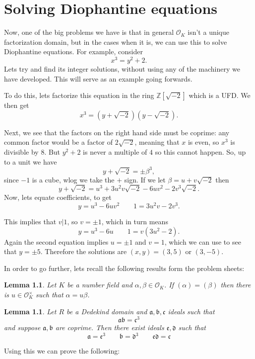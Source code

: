 \documentclass[11pt,a4paper]{report}
\theoremstyle{plain}
\newtheorem{lem}[subsection]{Lemma}
\theoremstyle{definition}
\theoremstyle{definition}
\newcommand{\ZZ}{\mathbb{Z}}
\def\gothb{\mathfrak{b}}
\def\gothc{\mathfrak{c}}
\def \a{\alpha}
\def \OO {\mathcal{O}}
\def\gotha{\mathfrak{a}}
\begin{document}
\chapter{Solving Diophantine equations}
Now, one of the big problems we have is that in general $\OO_K$ isn't a unique factorization domain, but in the cases when it is, we can use this to solve Diophantine equations. For example, consider \[x^3=y^2+2.\] Lets try and find its integer solutions, without using any of the machinery we have developed. This will serve as an example going forwards.

To do this, lets factorize this equation in the ring $\ZZ[\sqrt{-2}]$ which is a UFD. We then get \[x^3=(y+\sqrt{-2})(y-\sqrt{-2}).\]

Next, we see that the factors on the right hand side must be coprime: any common factor would be a factor of $2\sqrt{-2}$, meaning that $x$ is even, so $x^3$ is divisible by $8$. But $y^2+2$ is never a multiple of $4$ so this cannot happen. So, up to a unit we have \[y+\sqrt{-2}=\pm \beta^3,\] since $-1$ is a cube, wlog we take the $+$ sign. If we let $\beta=u+v\sqrt{-2}$ then \[y+\sqrt{-2}=u^3+3u^2v\sqrt{-2}-6uv^2-2v^3\sqrt{-2}.\] Now, lets equate coefficients, to get \[y=u^3-6uv^2 \qquad 1=3u^2v-2v^3.\]

This implies that $v|1$, so $v=\pm 1$, which in turn means \[y=u^3-6u \qquad 1=v(3u^2-2).\] Again the second equation implies $u=\pm 1$ and $v=1$, which we can use to see that $y=\pm 5$. Therefore the solutions are $(x,y)=(3,5)$ or $(3,-5)$.

In order to go further, lets recall the following results form the problem sheets:

\begin{lem}\label{lem: princ ideals being eq}
	Let $K$ be a number field and $\a,\beta \in \OO_K$. If $(\a)=(\beta)$ then there is  $u \in \OO_K^\times$ such that $\a=u\beta$.
\end{lem}



\begin{lem}\label{lem: ideals mult to power}
	Let $R$ be a Dedekind domain and $\gotha,\gothb,\gothc$ ideals such that \[\gotha\gothb=\gothc^3\] and suppose $\gotha,\gothb$ are coprime. Then there exist ideals $\mathfrak{e},\mathfrak{d}$ such that \[\gotha=\mathfrak{e}^3 \qquad \gothb=\mathfrak{d}^3 \qquad \mathfrak{e}\mathfrak{d}=\gothc\] 
\end{lem}



Using this we can prove the following:
\end{document}
